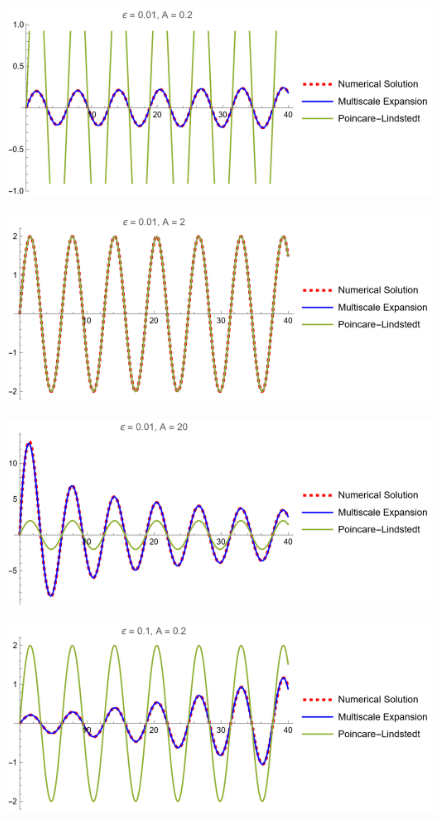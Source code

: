 \documentclass[12pt]{report}
\begin{document}
\begin{solution}
\begin{enumerate}
        \begin{figure}[H]
            \center
            \includegraphics[width=.8\textwidth]{plots/2c1.png}
        \end{figure}
        \begin{figure}[H]
            \center
            \includegraphics[width=.8\textwidth]{plots/2c2.png}
        \end{figure}
        \begin{figure}[H]
            \center
            \includegraphics[width=.8\textwidth]{plots/2c3.png}
        \end{figure}
        \begin{figure}[H]
            \center
            \includegraphics[width=.8\textwidth]{plots/2c4.png}

\end{figure}
\end{enumerate}
\end{solution}
\end{document}
